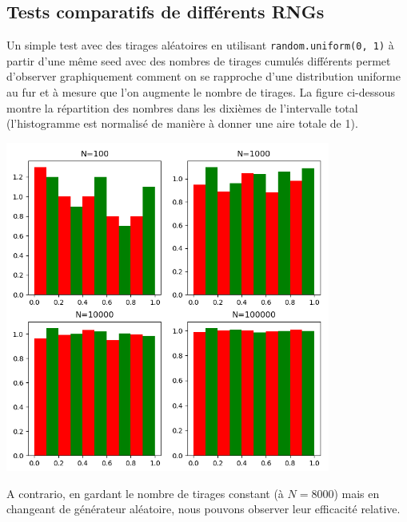 \documentclass{scrartcl}
\begin{document}
\subsection{Tests comparatifs de différents RNGs}
Un simple test avec des tirages aléatoires en utilisant
\texttt{random.uniform(0, 1)} à partir d'une même seed avec des nombres de
tirages cumulés différents permet d'observer graphiquement comment on se
rapproche d'une distribution uniforme au fur et à mesure que l'on augmente le
nombre de tirages. La figure ci-dessous montre la répartition des nombres dans
les dixièmes de l'intervalle total (l'histogramme est normalisé de manière à
donner une aire totale de 1).
\begin{center}
  \includegraphics[width=0.8\textwidth]{img/uniformes.png}\par
\end{center}

A contrario, en gardant le nombre de tirages constant (à $N=8000$) mais en
changeant de générateur aléatoire, nous pouvons observer leur efficacité
relative.
\end{document}
